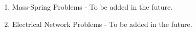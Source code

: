 \begin{multicols}{2}
\begin{enumerate}
\item Mass-Spring Problems - To be added in the future.


\item Electrical Network Problems - To be added in the future.

\end{enumerate}
\end{multicols}


